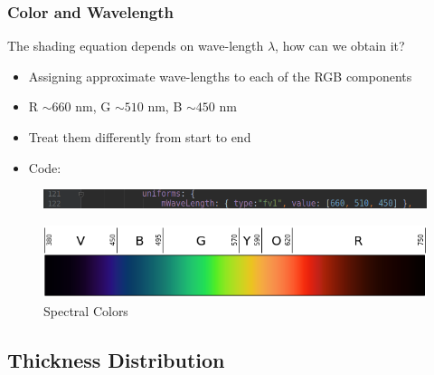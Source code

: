 \documentclass{beamer}
\begin{document}
\begin{frame}
	\frametitle{Color and Wavelength}
	The shading equation depends on wave-length $\lambda$, how can we obtain it?
	\begin{itemize}
	\item Assigning approximate wave-lengths to each of the RGB components
	\item R $\sim 660$ nm, G $\sim 510$ nm, B $\sim 450$ nm
	\item Treat them differently from start to end
	\item Code:
	\end{itemize}
	\begin{figure}
	\centering
	\includegraphics[width=1.00\linewidth]{color_code.png}
	\end{figure}
	\begin{figure}
	\centering
	\includegraphics[width=0.7\linewidth]{color_wavelength.png}
	\caption{Spectral Colors}
	\end{figure}
\end{frame}


\subsection{Thickness Distribution}
\end{document}
